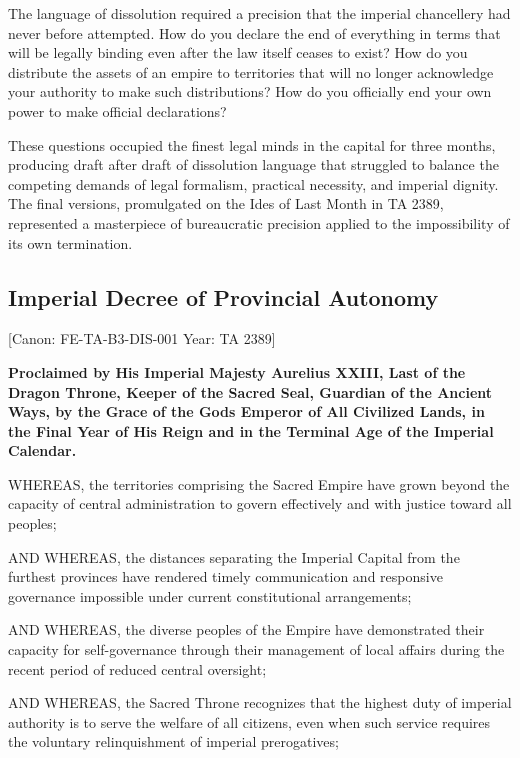 The language of dissolution required a precision that the imperial
chancellery had never before attempted. How do you declare the end of
everything in terms that will be legally binding even after the law
itself ceases to exist? How do you distribute the assets of an empire to
territories that will no longer acknowledge your authority to make such
distributions? How do you officially end your own power to make official
declarations?

These questions occupied the finest legal minds in the capital for three
months, producing draft after draft of dissolution language that
struggled to balance the competing demands of legal formalism, practical
necessity, and imperial dignity. The final versions, promulgated on the
Ides of Last Month in TA 2389, represented a masterpiece of bureaucratic
precision applied to the impossibility of its own termination.

\subsection{Imperial Decree of Provincial
Autonomy}\label{imperial-decree-of-provincial-autonomy}

{[}Canon: FE-TA-B3-DIS-001 \textbar{} Year: TA 2389{]}

\textbf{Proclaimed by His Imperial Majesty Aurelius XXIII, Last of the
Dragon Throne, Keeper of the Sacred Seal, Guardian of the Ancient Ways,
by the Grace of the Gods Emperor of All Civilized Lands, in the Final
Year of His Reign and in the Terminal Age of the Imperial Calendar.}

WHEREAS, the territories comprising the Sacred Empire have grown beyond
the capacity of central administration to govern effectively and with
justice toward all peoples;

AND WHEREAS, the distances separating the Imperial Capital from the
furthest provinces have rendered timely communication and responsive
governance impossible under current constitutional arrangements;

AND WHEREAS, the diverse peoples of the Empire have demonstrated their
capacity for self-governance through their management of local affairs
during the recent period of reduced central oversight;

AND WHEREAS, the Sacred Throne recognizes that the highest duty of
imperial authority is to serve the welfare of all citizens, even when
such service requires the voluntary relinquishment of imperial
prerogatives;

